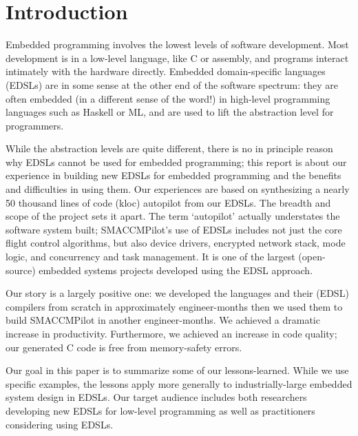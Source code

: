 \section{Introduction}

Embedded programming involves the lowest levels of software development.  Most
development is in a low-level language, like C or assembly, and programs
interact intimately with the hardware directly.  Embedded domain-specific
languages (EDSLs) are in some sense at the other end of the software
spectrum: they are often embedded (in a different sense of the word!) in
high-level programming languages such as Haskell or ML, and are used to
lift the abstraction level for programmers.

While the abstraction levels are quite different, there is no in principle
reason why EDSLs cannot be used for embedded programming; this report is about
our experience in building new EDSLs for embedded programming and the benefits
and difficulties in using them.  Our experiences are based on synthesizing a
nearly 50 thousand lines of code (kloc) autopilot from our EDSLs.  The breadth
and scope of the project sets it apart.  The term `autopilot' actually
understates the software system built; SMACCMPilot's use of EDSLs includes not
just the core flight control algorithms, but also device drivers, encrypted
network stack, mode logic, and concurrency and task management.  It is one of
the largest (open-source) embedded systems projects developed using the EDSL
approach.

Our story is a largely positive one: we developed the languages and their (EDSL)
compilers from scratch in approximately  engineer-months then we used
them to build SMACCMPilot in another  engineer-months.  We achieved a
dramatic increase in productivity.  Furthermore, we achieved an increase in
code quality; our generated C code is free from memory-safety errors.

Our goal in this paper is to summarize some of our lessons-learned.  While we
use specific examples, the lessons apply more generally to industrially-large
embedded system design in EDSLs.  Our target audience includes both researchers
developing new EDSLs for low-level programming as well as practitioners
considering using EDSLs.



